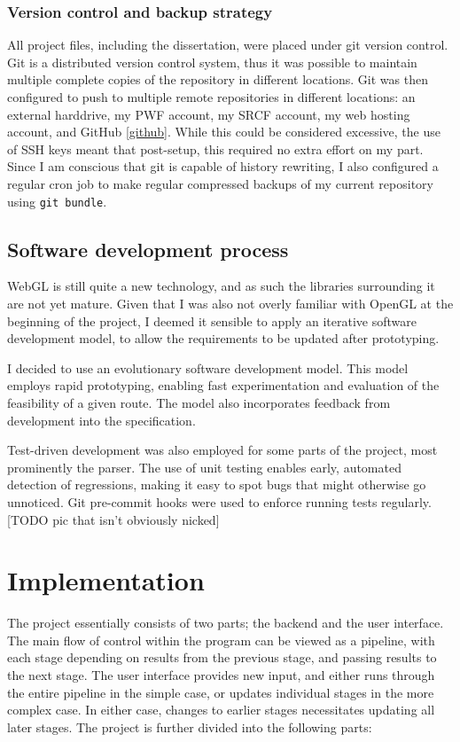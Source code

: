 \documentclass[12pt,twoside,notitlepage]{report}
\begin{document}
\subsection*{Version control and backup strategy}
All project files, including the dissertation, were placed under git version control. Git is a distributed version control system, thus it was possible to maintain multiple complete copies of the repository in different locations. Git was then configured to push to multiple remote repositories in different locations: an external harddrive, my PWF account, my SRCF account, my web hosting account, and GitHub \ref{github}. While this could be considered excessive, the use of SSH keys meant that post-setup, this required no extra effort on my part. Since I am conscious that git is capable of history rewriting, I also configured a regular cron job to make regular compressed backups of my current repository using \texttt{git bundle}.

\section{Software development process}
WebGL is still quite a new technology, and as such the libraries surrounding it are not yet mature. Given that I was also not overly familiar with OpenGL at the beginning of the project, I deemed it sensible to apply an iterative software development model, to allow the requirements to be updated after prototyping. 

I decided to use an evolutionary software development model. This model employs rapid prototyping, enabling fast experimentation and evaluation of the feasibility of a given route. The model also incorporates feedback from development into the specification.

Test-driven development was also employed for some parts of the project, most prominently the parser. The use of unit testing enables early, automated detection of regressions, making it easy to spot bugs that might otherwise go unnoticed. Git pre-commit hooks were used to enforce running tests regularly. [TODO pic that isn't obviously nicked]


\cleardoublepage
\chapter{Implementation}
The project essentially consists of two parts; the backend and the user interface. The main flow of control within the program can be viewed as a pipeline, with each stage depending on results from the previous stage, and passing results to the next stage. The user interface provides new input, and either runs through the entire pipeline in the simple case, or updates individual stages in the more complex case. In either case, changes to earlier stages necessitates updating all later stages. The project is further divided into the following parts:
\end{document}
